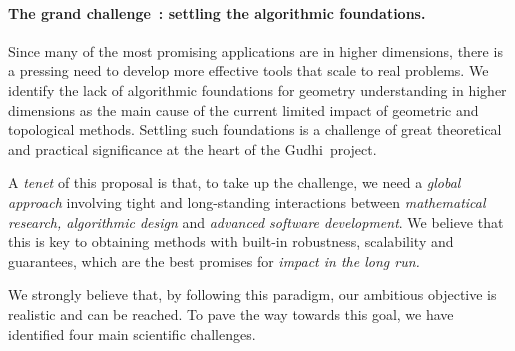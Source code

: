 


\vspace{-3.1mm}

\paragraph{The grand challenge~: settling the algorithmic foundations.}
Since many of the most promising applications are in higher dimensions, there is a pressing need to develop more effective tools that scale to real problems.  We identify the lack of  algorithmic foundations for geometry understanding in higher dimensions as 
the main cause of the current limited impact of geometric and topological methods.  Settling such foundations
is a challenge of great theoretical and practical significance at the heart of the Gudhi~project.


A {\em tenet} of this proposal is that, to take up the challenge, we need a {\em global approach} involving tight and long-standing interactions between {\em mathematical research, algorithmic design} and {\em advanced software development}. We believe that this is key to obtaining methods with built-in robustness, scalability and guarantees, which are the best promises for {\em impact in the long run.}

We strongly believe that, by following this paradigm,  our ambitious objective is realistic and can be reached. To pave the way towards this goal, we have identified  four main scientific challenges.


